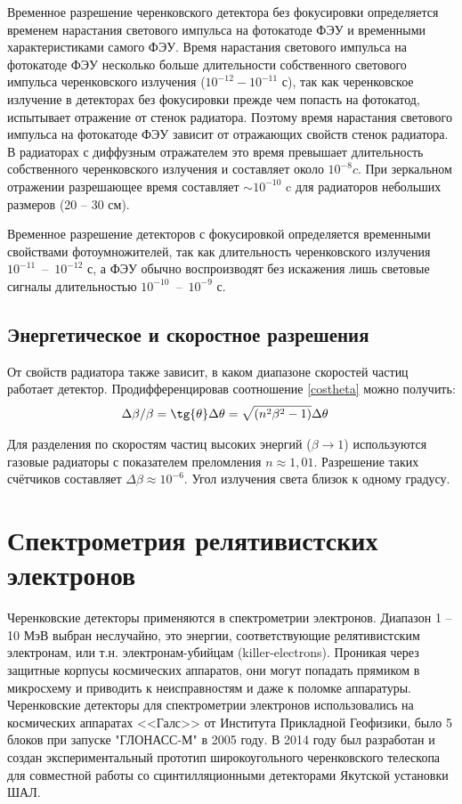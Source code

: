 \begin{main}
	Временное разрешение черенковского детектора без фокусировки определяется временем нарастания светового импульса на фотокатоде ФЭУ и временными характеристиками самого ФЭУ. Время нарастания светового импульса на фотокатоде ФЭУ несколько больше длительности собственного светового импульса черенковского излучения ($10^{-12} - 10^{-11}$ с), так как черенковское излучение в детекторах без фокусировки прежде чем попасть на фотокатод, испытывает отражение от стенок радиатора. Поэтому время нарастания светового импульса на фотокатоде ФЭУ зависит от отражающих свойств стенок радиатора. В радиаторах с диффузным отражателем это время превышает длительность собственного черенковского излучения и составляет около $10^{-8} c$. При зеркальном отражении разрешающее время составляет $\sim 10^{-10}$ c для радиаторов небольших размеров (20 -- 30 см).
	
	Временное разрешение детекторов с фокусировкой определяется временными свойствами фотоумножителей, так как длительность черенковского излучения $10^{-11}$~--~$10^{-12}$ с, а ФЭУ обычно воспроизводят без искажения лишь световые сигналы длительностью $10^{-10}$~--~$10^{-9}$ с.
	\subsection{Энергетическое и скоростное разрешения}
	\label{sec:subsection}
	От свойств радиатора также зависит, в каком диапазоне скоростей частиц работает детектор. Продифференцировав соотношение \ref{costheta} можно получить:
	\begin{align}
	&		\Delta\beta / \beta = \tg{\theta}\Delta\theta = \sqrt{(n^2\beta^2 - 1)}\Delta\theta
	\label{velocity}
	\end{align}
	
	 Для разделения по скоростям частиц высоких энергий ($ \beta \rightarrow 1 $) используются газовые радиаторы с показателем преломления $ n \approx 1,01 $. Разрешение таких счётчиков составляет $\Delta\beta \approx 10^{-6}$. Угол излучения света близок к одному градусу.
	 
	 \section{Спектрометрия релятивистских электронов}
	 Черенковские детекторы применяются в спектрометрии электронов. Диапазон 1 -- 10 МэВ выбран неслучайно, это энергии, соответствующие релятивистским электронам, или т.н. электронам-убийцам (killer-electrons). 
	 Проникая через защитные корпусы космических аппаратов, они могут попадать прямиком в микросхему и приводить к неисправностям и даже к поломке аппаратуры. 
	 Черенковские детекторы для спектрометрии электронов использовались на космических аппаратах <<Галс>> от Института Прикладной Геофизики, было 5 блоков при запуске "ГЛОНАСС-М" в 2005 году.
	 В 2014 году был разработан и создан экспериментальный прототип широкоугольного черенковского телескопа для совместной работы со сцинтилляционными детекторами Якутской установки ШАЛ.
	 
	
\end{main}